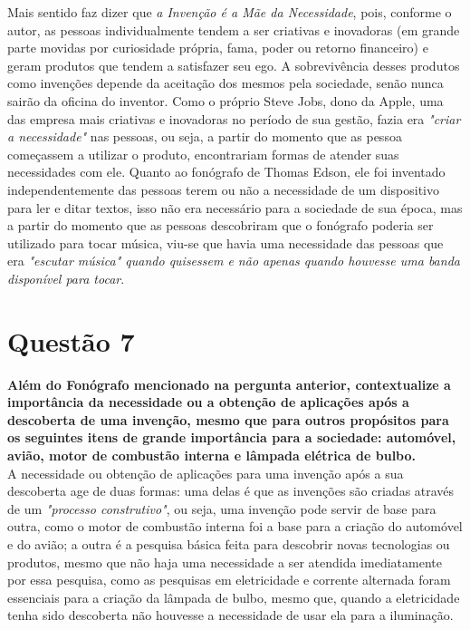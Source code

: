 Mais sentido faz dizer que \textit{a Invenção é a Mãe da Necessidade}, pois, conforme o autor, as pessoas individualmente tendem a ser criativas e inovadoras (em grande parte movidas por curiosidade própria, fama, poder ou retorno financeiro) e geram produtos que tendem a satisfazer seu ego. A sobrevivência desses produtos como invenções depende da aceitação dos mesmos pela sociedade, senão nunca sairão da oficina do inventor. Como o próprio Steve Jobs, dono da Apple, uma das empresa mais criativas e inovadoras no período de sua gestão, fazia era \textit{"criar a necessidade"} nas pessoas, ou seja, a partir do momento que as pessoa começassem a utilizar o produto, encontrariam formas de atender suas necessidades com ele. Quanto ao fonógrafo de Thomas Edson, ele foi inventado independentemente das pessoas terem ou não a necessidade de um dispositivo para ler e ditar textos, isso não era necessário para a sociedade de sua época, mas a partir do momento que as pessoas descobriram que o fonógrafo poderia ser utilizado para tocar música, viu-se que havia uma necessidade das pessoas que era \textit{"escutar música" quando quisessem e não apenas quando houvesse uma banda disponível para tocar}.


\section{Questão 7}
\label{sec:q7}
\textbf{Além do Fonógrafo mencionado na pergunta anterior, contextualize a importância da necessidade ou a obtenção de aplicações após a descoberta de uma invenção, mesmo que para outros propósitos para os seguintes itens de grande importância para a sociedade: automóvel, avião, motor de combustão interna e lâmpada elétrica de bulbo.} \\

A necessidade ou obtenção de aplicações para uma invenção após a sua descoberta age de duas formas: uma delas é que as invenções são criadas através de um \textit{"processo construtivo"}, ou seja, uma invenção pode servir de base para outra, como o motor de combustão interna foi a base para a criação do automóvel e do avião; a outra é a pesquisa básica feita para descobrir novas tecnologias ou produtos, mesmo que não haja uma necessidade a ser atendida imediatamente por essa pesquisa, como as pesquisas em eletricidade e corrente alternada foram essenciais para a criação da lâmpada de bulbo, mesmo que, quando a eletricidade tenha sido descoberta não houvesse a necessidade de usar ela para a iluminação.

